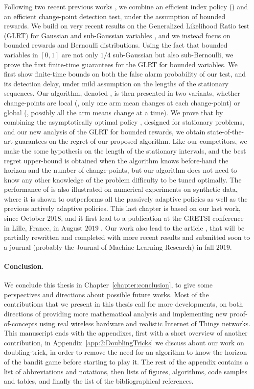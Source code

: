 Following two recent previous works \cite{LiuLeeShroff17,CaoZhenKvetonXie18}, we combine an efficient index policy (\klUCB) and an efficient change-point detection test, under the assumption of bounded rewards.
We build on very recent results on the Generalized Likelihood Ratio test (GLRT) for Gaussian and sub-Gaussian variables \cite{Maillard2018GLR}, and we instead focus on bounded rewards and Bernoulli distributions.
Using the fact that bounded variables in $[0,1]$ are not only $1/4$ sub-Gaussian but also sub-Bernoulli, we prove the first finite-time guarantees for the GLRT for bounded variables.
We first show finite-time bounds on both the false alarm probability of our test, and its detection delay, under mild assumption on the lengths of the stationary sequences.
Our algorithm, denoted \GLRklUCB, is then presented in two variants, whether change-points are local (\ie, only one arm mean changes at each change-point) or global (\ie, possibly all the arm means change at a time).
%
We prove that by combining the asymptotically optimal policy \klUCB, designed for stationary problems, and our new analysis of the GLRT for bounded rewards, we obtain state-of-the-art guarantees on the regret of our proposed algorithm.
Like our competitors, we make the some hypothesis on the length of the stationary intervals, and the best regret upper-bound is obtained when the algorithm knows before-hand the horizon and the number of change-points, but our algorithm does not need to know any other knowledge of the problem difficulty to be tuned optimally.
%
The performance of \GLRklUCB{} is also illustrated on numerical experiments on synthetic data, where it is shown to outperforms all the passively adaptive policies as well as the previous actively adaptive policies.
%
This last chapter is based on our last work, since October $2018$, and it first lead to a publication at the GRETSI conference in Lille, France, in August $2019$ \cite{Besson2019Gretsi}.
Our work also lead to the article \cite{Besson2019GLRT}, that will be partially rewritten and completed with more recent results and submitted soon to a journal (probably the Journal of Machine Learning Research) in fall $2019$.


\paragraph{Conclusion.}
%
We conclude this thesis in Chapter~\ref{chapter:conclusion}, to give some perspectives and directions about possible future works.
Most of the contributions that we present in this thesis call for more developments, on both directions of providing more mathematical analysis and implementing new proof-of-concepts using real wireless hardware and realistic Internet of Things networks.
%
This manuscript ends with the appendixes, first with a short overview of another contribution, in Appendix~\ref{app:2:DoublingTricks} we discuss about our work on doubling-trick, in order to remove the need for an algorithm to know the horizon of the bandit game before starting to play it.
The rest of the appendix contains a list of abbreviations and notations, then lists of figures, algorithms, code samples and tables,
and finally the list of the bibliographical references.


